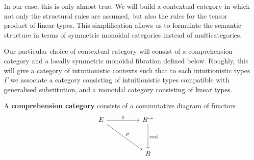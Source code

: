 In our case, this is only almost true. We will build a contextual category in which not only the structural rules are assumed, but also the rules for the tensor product of linear types. This simplification allows us to formulate the semantic structure in terms of symmetric monoidal categories instead of multicategories.

Our particular choice of contextual category will consist of a comprehension category \cite{jacobs} and a locally symmetric monoidal fibration defined below. Roughly, this will give a category of intuitionistic contexts such that to each intuitionistic types $\Gamma$ we associate a category consisting of intuitionistic types compatible with generalised substitution, and a monoidal category consisting of linear types.
\begin{defn}
A \textbf{comprehension category} consists of a commutative diagram of functors
\[
\ti
E \ar[rd, "p"] \ar[r, "\pi"]  & B^{\to} \ar[d, "\text{cod}"]\\
& B
\kz
\]


\end{defn}
